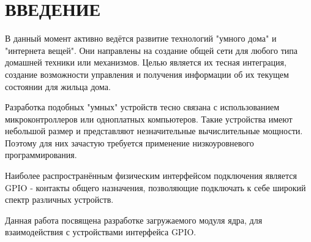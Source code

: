 \section*{ВВЕДЕНИЕ}

В данный момент активно ведётся развитие технологий "умного дома" и "интернета вещей". Они направлены на создание общей сети для любого типа домашней техники или механизмов. Целью является их тесная интеграция, создание возможности управления и получения информации об их текущем состоянии для жильца дома. 

Разработка подобных "умных" устройств тесно связана с использованием микроконтроллеров или одноплатных компьютеров. Такие устройства имеют небольшой размер и представляют незначительные вычислительные мощности. Поэтому для них зачастую требуется применение низкоуровневого программирования. 

Наиболее распространённым физическим интерфейсом подключения является GPIO - контакты общего назначения, позволяющие подключать к себе широкий спектр различных устройств.

Данная работа посвящена разработке загружаемого модуля ядра, для взаимодействия с устройствами интерфейса GPIO. 